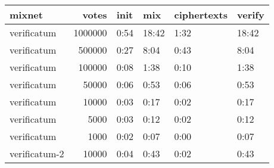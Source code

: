 \documentclass{standalone}
\begin{document}
\begin{tabular}{lrllll}
\hline
 mixnet        &   votes & init   & mix   & ciphertexts   & verify   \\
\hline
 verificatum   & 1000000 & 0:54   & 18:42 & 1:32          & 18:42    \\
 verificatum   &  500000 & 0:27   & 8:04  & 0:43          & 8:04     \\
 verificatum   &  100000 & 0:08   & 1:38  & 0:10          & 1:38     \\
 verificatum   &   50000 & 0:06   & 0:53  & 0:06          & 0:53     \\
 verificatum   &   10000 & 0:03   & 0:17  & 0:02          & 0:17     \\
 verificatum   &    5000 & 0:03   & 0:12  & 0:02          & 0:12     \\
 verificatum   &    1000 & 0:02   & 0:07  & 0:00          & 0:07     \\
 verificatum-2 &   10000 & 0:04   & 0:43  & 0:02          & 0:43     \\
\hline
\end{tabular}
\end{document}
